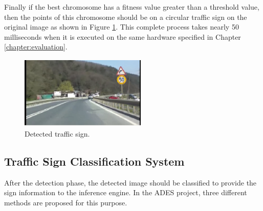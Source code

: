 \documentclass[a4paper,oneside,12pt]{report}
\begin{document}
\par
Finally if the best chromosome has a fitness value greater than a threshold value, then the points of this chromosome should be on a circular traffic sign on the original image as shown in  Figure \ref{fig:sdfig5}. This complete process takes nearly 50 milliseconds when it is executed on the same hardware specified in Chapter \ref{chapter:evaluation}.
\begin{figure}[ht]
\begin{center}
\includegraphics[width=60mm,height=35mm]{img/sdfig5.eps}
\caption{Detected traffic sign.}
\label{fig:sdfig5}
\end{center}
\end{figure}
\par
\subsection{Traffic Sign Classification System}
After the detection phase, the detected image should be classified to provide the sign information to the inference engine. In the ADES project, three different methods are proposed for this purpose.
\end{document}
